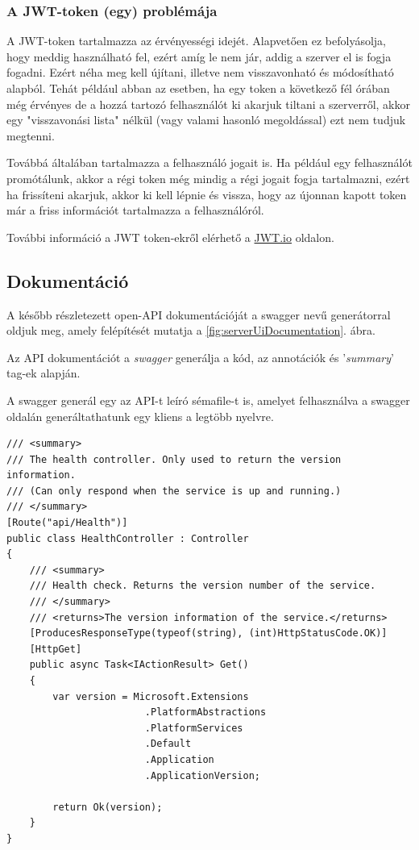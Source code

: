 \documentclass[twoside, a4paper, 12pt]{book}
\begin{document}
\subsubsection{A JWT-token (egy) problémája}
A JWT-token tartalmazza az érvényességi idejét. Alapvetően ez befolyásolja, hogy meddig használható fel, ezért amíg le nem jár, addig a szerver el is fogja fogadni. Ezért néha meg kell újítani, illetve nem visszavonható és módosítható alapból. Tehát például abban az esetben, ha egy token a következő fél órában még érvényes de a hozzá tartozó felhasználót ki akarjuk tiltani a szerverről, akkor egy "visszavonási lista" nélkül (vagy valami hasonló megoldással) ezt nem tudjuk megtenni.

Továbbá általában tartalmazza a felhasználó jogait is. Ha például egy felhasználót promótálunk, akkor a régi token még mindig a régi jogait fogja tartalmazni, ezért ha frissíteni akarjuk, akkor ki kell lépnie és vissza, hogy az újonnan kapott token már a friss információt tartalmazza a felhasználóról.

További információ a JWT token-ekről elérhető a \href{https://jwt.io/}{JWT.io} oldalon.

\subsection{Dokumentáció}
A később részletezett open-API dokumentációját a swagger nevű generátorral oldjuk meg, amely felépítését mutatja a \ref{fig:serverUiDocumentation}. ábra.

Az API dokumentációt a \textit{swagger}\cite{swaggerHomepage} generálja a kód, az annotációk és '\textit{summary}' tag-ek alapján.

A swagger generál egy az API-t leíró sémafile-t is, amelyet felhasználva a swagger oldalán generáltathatunk egy kliens a legtöbb nyelvre.

\begin{minipage}{\linewidth}
\begin{lstlisting}[caption=Health-check példakód 'summary' tag-ekkel., label=lst:healtcheck]
/// <summary>
/// The health controller. Only used to return the version information.
/// (Can only respond when the service is up and running.)
/// </summary>
[Route("api/Health")]
public class HealthController : Controller
{
	/// <summary>
	/// Health check. Returns the version number of the service.
	/// </summary>
	/// <returns>The version information of the service.</returns>
	[ProducesResponseType(typeof(string), (int)HttpStatusCode.OK)]
	[HttpGet]
	public async Task<IActionResult> Get()
	{
		var version = Microsoft.Extensions
						.PlatformAbstractions
						.PlatformServices
						.Default
						.Application
						.ApplicationVersion;

		return Ok(version);
	}
}
\end{lstlisting}
\end{minipage}
	
\end{document}
